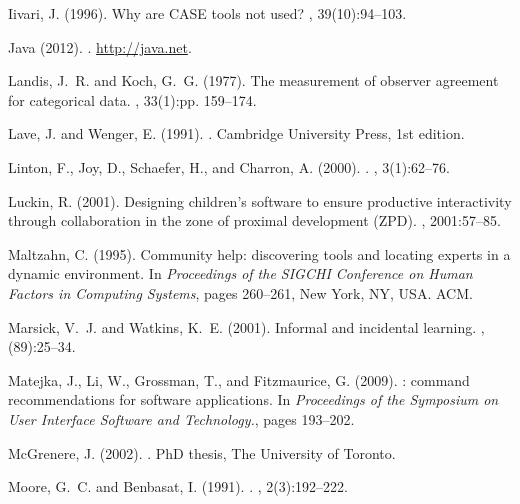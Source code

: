 \documentclass[smallextended]{svjour3}
\begin{document}
\begin{thebibliography}{}
Iivari, J. (1996).
\newblock Why are {CASE} tools not used?
, 39(10):94--103.

Java (2012).
.
\newblock \url{http://java.net}.

Landis, J.~R. and Koch, G.~G. (1977).
\newblock The measurement of observer agreement for categorical data.
, 33(1):pp. 159--174.

Lave, J. and Wenger, E. (1991).
.
\newblock Cambridge University Press, 1st edition.

Linton, F., Joy, D., Schaefer, H., and Charron, A. (2000).
.
, 3(1):62--76.

Luckin, R. (2001).
\newblock Designing children's software to ensure productive interactivity
  through collaboration in the zone of proximal development ({ZPD}).
, 2001:57--85.

Maltzahn, C. (1995).
\newblock Community help: discovering tools and locating experts in a dynamic
  environment.
\newblock In {\em Proceedings of the SIGCHI Conference on Human Factors in
  Computing Systems}, pages 260--261, New York, NY, USA. ACM.

Marsick, V.~J. and Watkins, K.~E. (2001).
\newblock Informal and incidental learning.
, (89):25--34.

Matejka, J., Li, W., Grossman, T., and Fitzmaurice, G. (2009).
: command recommendations for software
  applications.
\newblock In {\em Proceedings of the Symposium on User Interface Software and
  Technology.}, pages 193--202.

McGrenere, J. (2002).
.
\newblock PhD thesis, The University of Toronto.

Moore, G.~C. and Benbasat, I. (1991).
.
, 2(3):192--222.


\end{thebibliography}
\end{document}
